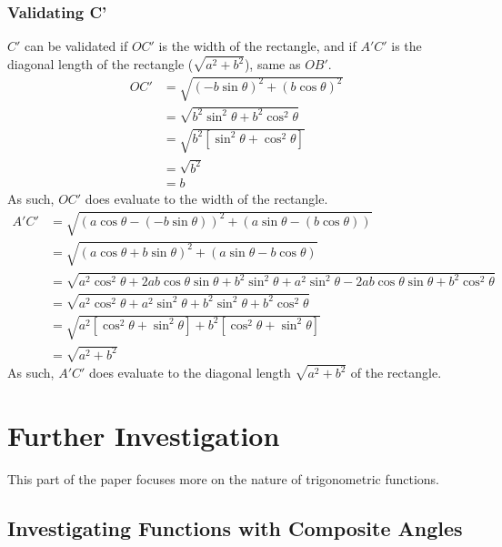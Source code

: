\documentclass{article}
\begin{document}
        \subsubsection{Validating C'} $C'$ can be validated if $OC'$ is the width of the rectangle, and if $A'C'$ is the diagonal length of the rectangle ($\sqrt{a^2 + b^2}$), same as $OB'$.
        \begin{align*}
        	OC' &= \sqrt{(-b\sin{\theta})^2 + (b\cos{\theta})^2} \\
        	&= \sqrt{b^2\sin^2{\theta} + b^2\cos^2{\theta}} \\
        	&= \sqrt{b^2[\sin^2{\theta} + \cos^2{\theta}]} \\
        	&= \sqrt{b^2} \\
        	&= b
        \end{align*}
        As such, $OC'$ does evaluate to the width of the rectangle.
        \begin{align*}
        	A'C' &= \sqrt{(a\cos\theta - (-b\sin\theta))^2 + (a\sin\theta - (b\cos\theta))} \\
        	&= \sqrt{(a\cos\theta + b\sin\theta)^2 + (a\sin\theta - b\cos\theta)} \\
        	&= \sqrt{a^2\cos^2\theta + 2ab\cos\theta\sin\theta + b^2\sin^2\theta + a^2\sin^2\theta - 2ab\cos\theta\sin\theta + b^2\cos^2\theta} \\
        	&= \sqrt{a^2\cos^2\theta + a^2\sin^2\theta + b^2\sin^2\theta + b^2\cos^2\theta} \\
        	&= \sqrt{a^2[\cos^2\theta + \sin^2\theta] + b^2[\cos^2\theta + \sin^2\theta]} \\
        	&= \sqrt{a^2 + b^2}
        \end{align*}
        As such, $A'C'$ does evaluate to the diagonal length $\sqrt{a^2 + b^2}$ of the rectangle.
        \newpage
        \section{Further Investigation} This part of the paper focuses more on the nature of trigonometric functions.
        \subsection{Investigating Functions with Composite Angles}
\end{document}
